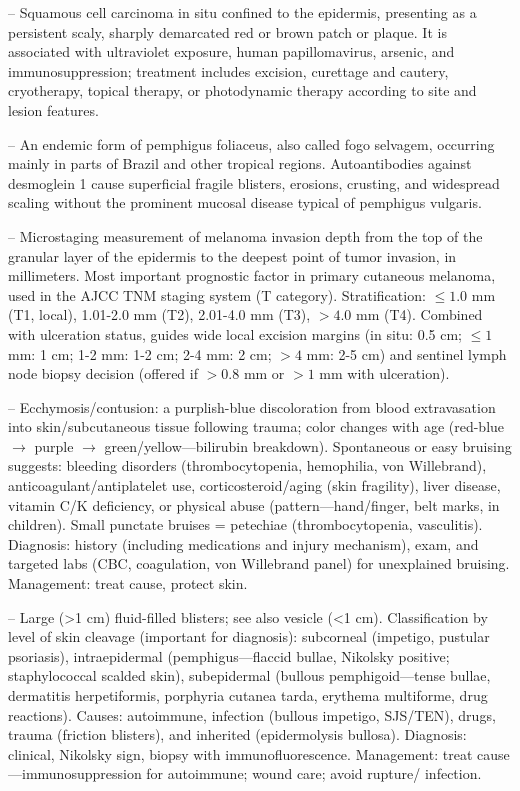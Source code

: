-- Squamous cell carcinoma in situ confined to the epidermis, presenting as a persistent scaly, sharply demarcated red or brown patch or plaque. It is associated with ultraviolet exposure, human papillomavirus, arsenic, and immunosuppression; treatment includes excision, curettage and cautery, cryotherapy, topical therapy, or photodynamic therapy according to site and lesion features.

-- An endemic form of pemphigus foliaceus, also called fogo selvagem, occurring mainly in parts of Brazil and other tropical regions. Autoantibodies against desmoglein 1 cause superficial fragile blisters, erosions, crusting, and widespread scaling without the prominent mucosal disease typical of pemphigus vulgaris.

-- Microstaging measurement of melanoma invasion depth from the top of the granular layer of the epidermis to the deepest point of tumor invasion, in millimeters. Most important prognostic factor in primary cutaneous melanoma, used in the AJCC TNM staging system (T category). Stratification: $\le 1.0$ mm (T1, local), 1.01-2.0 mm (T2), 2.01-4.0 mm (T3), $> 4.0$ mm (T4). Combined with ulceration status, guides wide local excision margins (in situ: 0.5 cm; $\le 1$ mm: 1 cm; 1-2 mm: 1-2 cm; 2-4 mm: 2 cm; $> 4$ mm: 2-5 cm) and sentinel lymph node biopsy decision (offered if $> 0.8$ mm or $> 1$ mm with ulceration).

-- Ecchymosis/contusion: a purplish-blue discoloration from blood extravasation into skin/subcutaneous tissue following trauma; color changes with age (red-blue $\rightarrow$ purple $\rightarrow$ green/yellow—bilirubin breakdown). Spontaneous or easy bruising suggests: bleeding disorders (thrombocytopenia, hemophilia, von Willebrand), anticoagulant/antiplatelet use, corticosteroid/aging (skin fragility), liver disease, vitamin C/K deficiency, or physical abuse (pattern—hand/finger, belt marks, in children). Small punctate bruises = petechiae (thrombocytopenia, vasculitis). Diagnosis: history (including medications and injury mechanism), exam, and targeted labs (CBC, coagulation, von Willebrand panel) for unexplained bruising. Management: treat cause, protect skin.

-- Large (>1 cm) fluid-filled blisters; see also vesicle (<1 cm). Classification by level of skin cleavage (important for diagnosis): subcorneal (impetigo, pustular psoriasis), intraepidermal (pemphigus—flaccid bullae, Nikolsky positive; staphylococcal scalded skin), subepidermal (bullous pemphigoid—tense bullae, dermatitis herpetiformis, porphyria cutanea tarda, erythema multiforme, drug reactions). Causes: autoimmune, infection (bullous impetigo, SJS/TEN), drugs, trauma (friction blisters), and inherited (epidermolysis bullosa). Diagnosis: clinical, Nikolsky sign, biopsy with immunofluorescence. Management: treat cause—immunosuppression for autoimmune; wound care; avoid rupture/ infection.

